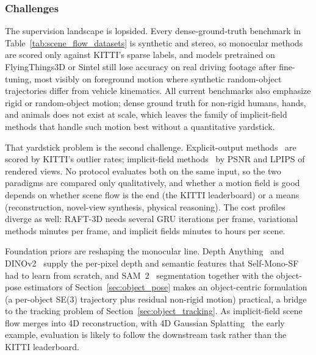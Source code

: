 \subsubsection{Challenges}

The supervision landscape is lopsided. Every dense-ground-truth benchmark in Table~\ref{tab:scene_flow_datasets} is synthetic and stereo, so monocular methods are scored only against KITTI's sparse labels, and models pretrained on FlyingThings3D or Sintel still lose accuracy on real driving footage after fine-tuning, most visibly on foreground motion where synthetic random-object trajectories differ from vehicle kinematics. All current benchmarks also emphasize rigid or random-object motion; dense ground truth for non-rigid humans, hands, and animals does not exist at scale, which leaves the family of implicit-field methods that handle such motion best without a quantitative yardstick.

That yardstick problem is the second challenge. Explicit-output methods~\cite{vogel20153d,jiang2019sense,teed2021raft} are scored by KITTI's outlier rates; implicit-field methods~\cite{li2021neural,pumarola2021d,wu20244d} by PSNR and LPIPS of rendered views. No protocol evaluates both on the same input, so the two paradigms are compared only qualitatively, and whether a motion field is good depends on whether scene flow is the end (the KITTI leaderboard) or a means (reconstruction, novel-view synthesis, physical reasoning). The cost profiles diverge as well: RAFT-3D needs several GRU iterations per frame, variational methods minutes per frame, and implicit fields minutes to hours per scene.

Foundation priors are reshaping the monocular line. Depth Anything~\cite{DepthAnything} and DINOv2~\cite{dinov2} supply the per-pixel depth and semantic features that Self-Mono-SF had to learn from scratch, and SAM~2~\cite{ravi2024sam2} segmentation together with the object-pose estimators of Section~\ref{sec:object_pose} makes an object-centric formulation (a per-object SE(3) trajectory plus residual non-rigid motion) practical, a bridge to the tracking problem of Section~\ref{sec:object_tracking}. As implicit-field scene flow merges into 4D reconstruction, with 4D Gaussian Splatting~\cite{wu20244d} the early example, evaluation is likely to follow the downstream task rather than the KITTI leaderboard.




